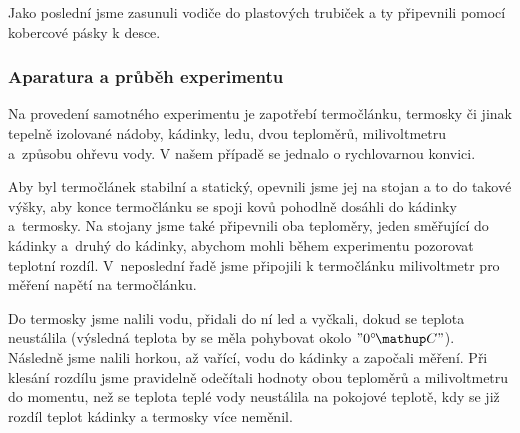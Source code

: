 Jako poslední jsme zasunuli vodiče do plastových trubiček a ty připevnili
pomocí kobercové pásky k desce.

\subsubsection{Aparatura a průběh experimentu}
Na provedení samotného experimentu je zapotřebí termočlánku, termosky či jinak
tepelně izolované nádoby, kádinky, ledu, dvou teploměrů, milivoltmetru
a~způsobu ohřevu vody. V našem případě se jednalo o rychlovarnou konvici.

Aby byl termočlánek stabilní a statický, opevnili jsme jej na stojan a to do
takové výšky, aby konce termočlánku se spoji kovů pohodlně dosáhli do kádinky
a~termosky.  Na stojany jsme také připevnili oba teploměry, jeden směřující do
kádinky a~druhý do kádinky, abychom mohli během experimentu pozorovat teplotní
rozdíl.  V~neposlední řadě jsme připojili k termočlánku milivoltmetr pro měření
napětí na termočlánku. 

Do termosky jsme nalili vodu, přidali do ní led a vyčkali, dokud se teplota
neustálila (výsledná teplota by se měla pohybovat okolo $"0\C"$). Následně jsme
nalili horkou, až vařící, vodu do kádinky a započali měření. Při klesání
rozdílu jsme pravidelně odečítali hodnoty obou teploměrů a milivoltmetru do
momentu, než se teplota teplé vody neustálila na pokojové teplotě, kdy se již
rozdíl teplot kádinky a termosky více neměnil.
